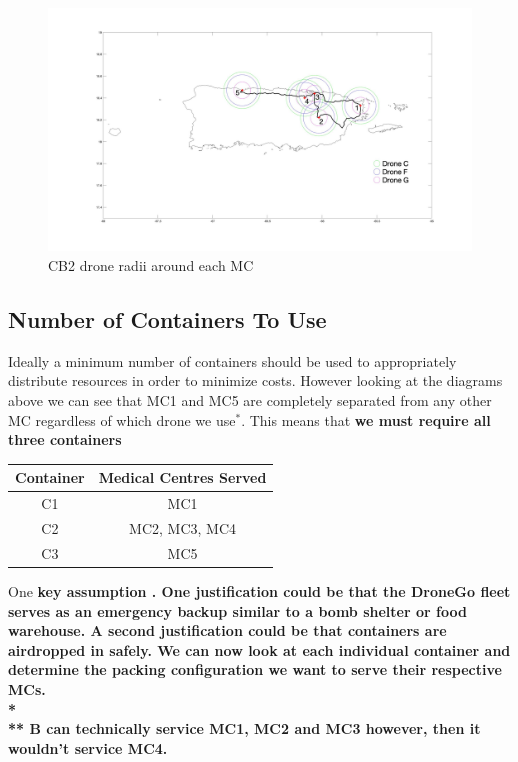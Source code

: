 \documentclass[a4paper,12pt]{article}
\begin{document}
\begin{figure}[h]
\centering
\includegraphics[scale =0.15]{CB2}
\caption{CB2 drone radii around each MC}
\label{cb2}
\end{figure}

\newpage

\subsection{Number of Containers To Use}
Ideally a minimum number of containers should be used to appropriately distribute resources in order to minimize costs.
However looking at the diagrams above we can see that MC1 and MC5 are completely separated from any other MC regardless
of which drone we use$^{*}$. This means that \bf{we must require all three containers} 

\begin{center}
\begin{tabular}{ |c|c| }
 \hline
 Container & Medical Centres Served \\\hline
  C1 & MC1 \\
  C2 & MC2, MC3, MC4  \\
  C3 & MC5 \\
 \hline
\end{tabular}
\end{center}

One \bf{key assumption} . One justification could be that the DroneGo fleet serves as an emergency backup similar to a bomb shelter or food warehouse.
A second justification could be that containers are airdropped in safely.
We can now look at each individual container and determine the packing configuration we want to serve their respective MCs.\\*
\\**
\footnotesize{B can technically service MC1, MC2 and MC3 however, then it wouldn't service MC4}\normalsize{.}
\end{document}
